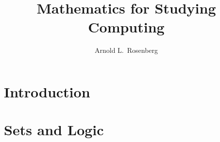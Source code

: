 \documentclass{article}
\begin{document}
\title{Mathematics for Studying Computing}

\author{Arnold L.~Rosenberg}


\maketitle






\section{Introduction}
\label{s.background-math}



\section{Sets and Logic}
\label{s.sets}
\end{document}
